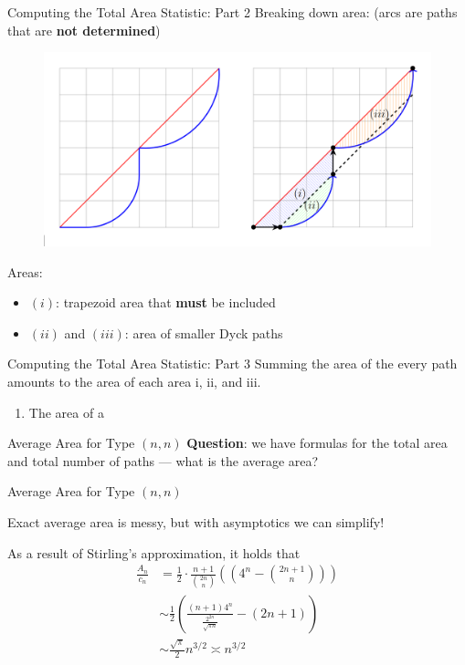 \documentclass{beamer}
\begin{document}
\begin{frame}{Computing the Total Area Statistic: Part 2}
    Breaking down area: (arcs are paths that are \textbf{not determined})

    \begin{figure}
        \centering
        \includegraphics[width=0.75\linewidth]{Summing Dyck Area.png}
    \end{figure}

    Areas:
    \begin{itemize}
        \item $(i)$: trapezoid area that \textbf{must} be included
        \item $(ii)$ and $(iii)$: area of smaller Dyck paths
    \end{itemize}
\end{frame}

\begin{frame}{Computing the Total Area Statistic: Part 3}
    Summing the area of the every path amounts to the area of each area i, ii, and iii.
    \begin{enumerate}[i]
        \item The area of a 
    \end{enumerate}
    
\end{frame}

\begin{frame}{Average Area for Type $(n,n)$}
    \textbf{Question}: we have formulas for the total area and total number of paths — what is the average area?
\end{frame}

\begin{frame}{Average Area for Type $(n,n)$}

Exact average area is messy, but with asymptotics we can simplify!

\begin{theorem}
As a result of Stirling's approximation, it holds that
\begin{align*}
\frac{A_n}{c_n} &= \frac{1}{2}\cdot\frac{n+1}{\binom{2n}{n}}( \left(4^{n} - \binom{2n+1}{n}\right))
\\ &\sim \frac{1}{2} \left({\frac{(n+1)4^{n}}{\frac{2^{2n}}{\sqrt{\pi n}}} - (2n+1)}\right)
\\ &\sim \frac{\sqrt{\pi}}{2} n^{3/2} \asymp n^{3/2}
\end{align*}
\end{theorem}
\end{frame}
\end{document}
